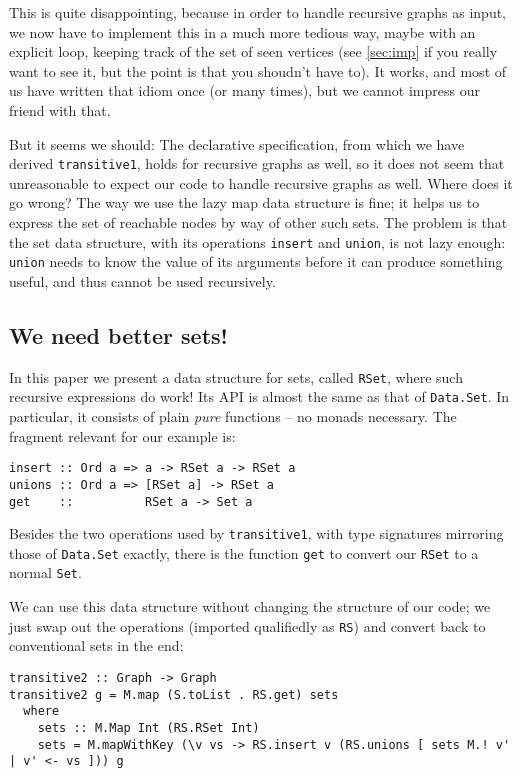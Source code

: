 \documentclass[manuscript,screen,acmsmall]{acmart}
\begin{document}
This is quite disappointing, because in order to handle recursive graphs as input, we now have to implement this in a much more tedious way, maybe with an explicit loop, keeping track of the set of seen vertices (see \cref{sec:imp} if you really want to see it, but the point is that you shoudn’t have to). It works, and most of us have written that idiom once (or many times), but we cannot impress our friend with that.

But it seems we should: The declarative specification, from which we have derived \verb|transitive1|, holds for recursive graphs as well, so it does not seem that unreasonable to expect our code to handle recursive graphs as well. Where does it go wrong? The way we use the lazy map data structure is fine; it helps us to express the set of reachable nodes by way of other such sets.
The problem is that the set data structure, with its operations \verb|insert| and \verb|union|, is not lazy enough: \verb|union| needs to know the value of its arguments before it can produce something useful, and thus cannot be used recursively.

\subsection{We need better sets!}

In this paper we present a data structure for sets, called \verb|RSet|, where such recursive expressions do work! Its API is almost the same as that of \verb|Data.Set|. In particular, it consists of plain \emph{pure} functions -- no monads necessary. The fragment relevant for our example is:
\begin{verbatim}
insert :: Ord a => a -> RSet a -> RSet a
unions :: Ord a => [RSet a] -> RSet a
get    ::          RSet a -> Set a
\end{verbatim}
Besides the two operations used by \verb|transitive1|, with type signatures mirroring those of \verb|Data.Set| exactly, there is the function \verb|get| to convert our \verb|RSet| to a normal \verb|Set|.

We can use this data structure without changing the structure of our code; we just swap out the operations (imported qualifiedly as \verb|RS|) and convert back to conventional sets in the end:
\begin{verbatim}
transitive2 :: Graph -> Graph
transitive2 g = M.map (S.toList . RS.get) sets
  where
    sets :: M.Map Int (RS.RSet Int)
    sets = M.mapWithKey (\v vs -> RS.insert v (RS.unions [ sets M.! v' | v' <- vs ])) g
\end{verbatim}
\end{document}

